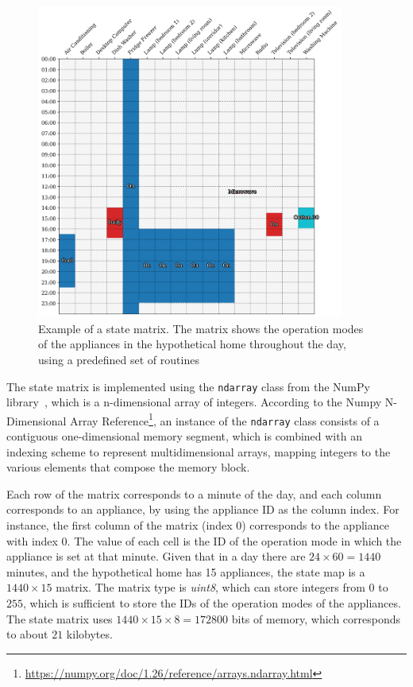 \begin{figure}
    \centering
    \includegraphics[width=0.9\textwidth]{images/real_matrix.png}
    \caption[Example of a state matrix]{Example of a state matrix. The matrix shows the operation modes of the appliances in the hypothetical home throughout the day, using a predefined set of routines}
    \label{fig:state_matrix}
\end{figure}

The state matrix is implemented using the \texttt{ndarray} class from the NumPy library~\parencite{harrisArrayProgrammingNumPy2020}, which is a n-dimensional array of integers. According to the Numpy N-Dimensional Array Reference\footnote{\url{https://numpy.org/doc/1.26/reference/arrays.ndarray.html}}, an instance of the \texttt{ndarray} class consists of a contiguous one-dimensional memory segment, which is combined with an indexing scheme to represent multidimensional arrays, mapping integers to the various elements that compose the memory block.

Each row of the matrix corresponds to a minute of the day, and each column corresponds to an appliance, by using the appliance ID as the column index. For instance, the first column of the matrix (index $0$) corresponds to the appliance with index 0. The value of each cell is the ID of the operation mode in which the appliance is set at that minute. Given that in a day there are $24 \times 60 = 1440$ minutes, and the hypothetical home has 15 appliances, the state map is a $1440 \times 15$ matrix. The matrix type is \textit{uint8}, which can store integers from $0$ to $255$, which is sufficient to store the IDs of the operation modes of the appliances. The state matrix uses $1440 \times 15 \times 8 = 172800$ bits of memory, which corresponds to about $21$ kilobytes.

